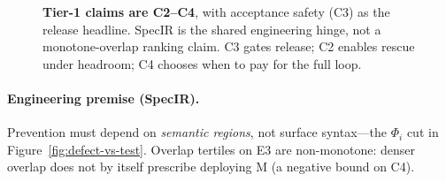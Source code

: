 

\begin{figure}[t]
  \centering
  \caption{\textbf{Tier-1 claims are C2--C4}, with acceptance safety (C3) as
    the release headline.
    SpecIR is the shared engineering hinge, not a monotone-overlap ranking
    claim.
    C3 gates release; C2 enables rescue under headroom; C4 chooses when to
    pay for the full loop.}
  \label{fig:contribution-map}
\end{figure}

\paragraph{Engineering premise (SpecIR).}
Prevention must depend on \emph{semantic regions}, not surface syntax---the
$\Phi_i$ cut in Figure~\ref{fig:defect-vs-test}.
Overlap tertiles on E3 are non-monotone: denser overlap does not by itself
prescribe deploying M (a negative bound on C4).

